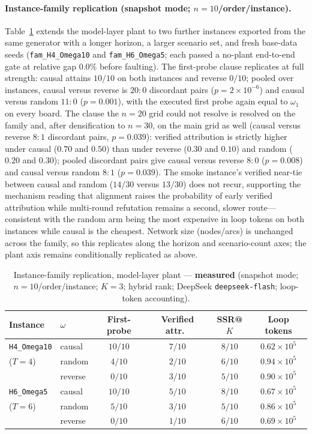 \documentclass[a4paper,fleqn]{cas-sc}
\begin{document}
\paragraph{Instance-family replication (snapshot mode; $n{=}10$/order/instance).}
Table~\ref{tab:exp_instances} extends the model-layer plant to two
further instances exported from the same generator with a longer horizon,
a larger scenario set, and fresh base-data seeds (\texttt{fam\_H4\_Omega10}
and \texttt{fam\_H6\_Omega5}; each passed a no-plant end-to-end gate at
relative gap $0.0\%$ before faulting). The first-probe clause replicates
at full strength: causal attains $10/10$ on both instances and reverse
$0/10$; pooled over instances, causal versus reverse is $20{:}0$
discordant pairs ($p=2\times10^{-6}$) and causal versus random $11{:}0$
($p=0.001$), with the executed first probe again equal to $\omega_1$ on
every board. The clause the $n{=}20$ grid could not resolve is resolved on
the family and, after densification to $n{=}30$, on the main grid as well
(causal versus reverse $8{:}1$ discordant pairs, $p=0.039$):
verified attribution is strictly higher under causal ($0.70$ and $0.50$)
than under reverse ($0.30$ and $0.10$) and random ($0.20$ and $0.30$);
pooled discordant pairs give causal versus reverse $8{:}0$ ($p=0.008$)
and causal versus random $8{:}1$ ($p=0.039$). The smoke instance's
verified near-tie between causal and random ($14/30$ versus $13/30$) does
not recur,
supporting the mechanism reading that alignment raises the probability of
early verified attribution while multi-round refutation remains a second,
slower route---consistent with the random arm being the most expensive in
loop tokens on both instances while causal is the cheapest. Network size
(nodes/arcs) is unchanged across the family, so this replicates along the
horizon and scenario-count axes; the plant axis remains conditionally
replicated as above.

\begin{table}[t]
\centering
\caption{Instance-family replication, model-layer plant ---
\textbf{measured} (snapshot mode; $n{=}10$/order/instance; $K{=}3$; hybrid
rank; DeepSeek \texttt{deepseek-flash}; loop-token accounting).}
\label{tab:exp_instances}
\begin{tabular}{@{}ll c c c c@{}}
\toprule
Instance & $\omega$ & First-probe & Verified attr.\ & SSR@$K$ & Loop tokens \\
\midrule
\texttt{H4\_Omega10} & causal  & $10/10$ & $7/10$ & $8/10$ & $0.62{\times}10^{5}$ \\
($T{=}4$)            & random  & $4/10$ & $2/10$ & $6/10$ & $0.94{\times}10^{5}$ \\
                     & reverse & $0/10$ & $3/10$ & $5/10$ & $0.90{\times}10^{5}$ \\
\midrule
\texttt{H6\_Omega5}  & causal  & $10/10$ & $5/10$ & $8/10$ & $0.67{\times}10^{5}$ \\
($T{=}6$)            & random  & $5/10$ & $3/10$ & $5/10$ & $0.86{\times}10^{5}$ \\
                     & reverse & $0/10$ & $1/10$ & $6/10$ & $0.69{\times}10^{5}$ \\
\bottomrule
\end{tabular}
\end{table}
\end{document}
